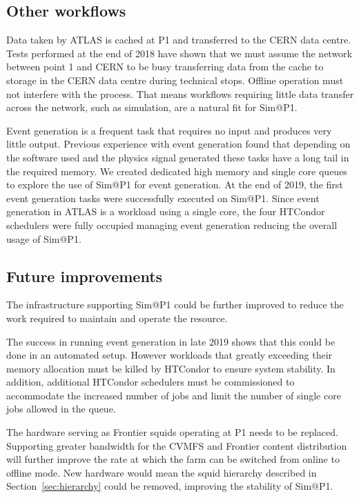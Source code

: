 \documentclass{webofc}
\begin{document}
\subsection{Other workflows}\label{sec:evgen}
Data taken by ATLAS is cached at P1 and transferred to the CERN data
centre. Tests performed at the end of 2018 have shown that we must assume the
network between point 1 and CERN to be busy transferring data from the cache to
storage in the CERN data centre during technical stops. Offline operation must
not interfere with the process. That means workflows requiring little data
transfer across the network, such as simulation, are a natural fit for Sim@P1.

Event generation is a frequent task that requires no input and produces very
little output. Previous experience with event generation found that depending on
the software used and the physics signal generated these tasks have a long tail
in the required memory. We created dedicated high memory and single core queues
to explore the use of Sim@P1 for event generation. At the end of 2019, the first
event generation tasks were successfully executed on Sim@P1. Since event
generation in ATLAS is a workload using a single core, the four HTCondor
schedulers were fully occupied managing event generation reducing the overall
usage of Sim@P1.

\subsection{Future improvements}
The infrastructure supporting Sim@P1 could be further improved to reduce the
work required to maintain and operate the resource.

The success in running event generation in late 2019 shows that this could be
done in an automated setup. However workloads that greatly exceeding their
memory allocation must be killed by HTCondor to ensure system stability. In
addition, additional HTCondor schedulers must be commissioned to accommodate the
increased number of jobs and limit the number of single core jobs allowed in the
queue.

The hardware serving as Frontier squids operating at P1 needs to be replaced.
Supporting greater bandwidth for the CVMFS and Frontier content distribution
will further improve the rate at which the farm can be switched from online to
offline mode. New hardware would mean the squid hierarchy described in
Section~\ref{sec:hierarchy} could be removed, improving the stability of Sim@P1.
\end{document}
